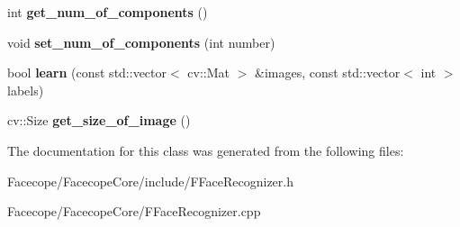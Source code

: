 \begin{DoxyCompactItemize}
int {\bfseries get\+\_\+num\+\_\+of\+\_\+components} ()
\item 
\mbox{\label{classFFaceRecognizer_ae26c8de753c3a5c48b2270d1e80d769c}} 
void {\bfseries set\+\_\+num\+\_\+of\+\_\+components} (int number)
\item 
\mbox{\label{classFFaceRecognizer_ad8d59cc8cd95ee58877b49f59bfbc48a}} 
bool {\bfseries learn} (const std\+::vector$<$ cv\+::\+Mat $>$ \&images, const std\+::vector$<$ int $>$ labels)
\item 
\mbox{\label{classFFaceRecognizer_a417ead8d39d07d5b1cbfc5b8ac95f014}} 
cv\+::\+Size {\bfseries get\+\_\+size\+\_\+of\+\_\+image} ()
\end{DoxyCompactItemize}


The documentation for this class was generated from the following files\+:\begin{DoxyCompactItemize}
\item 
Facecope/\+Facecope\+Core/include/F\+Face\+Recognizer.\+h\item 
Facecope/\+Facecope\+Core/F\+Face\+Recognizer.\+cpp\end{DoxyCompactItemize}
